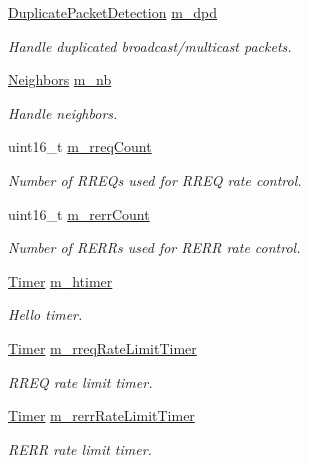 \begin{DoxyCompactItemize}
\hyperlink{classns3_1_1aodv_1_1DuplicatePacketDetection}{Duplicate\+Packet\+Detection} \hyperlink{classns3_1_1aodv_1_1RoutingProtocol_a43361f0a08b0c538415910cd904d0af9}{m\+\_\+dpd}
\begin{DoxyCompactList}\small\item\em Handle duplicated broadcast/multicast packets. \end{DoxyCompactList}\item 
\hyperlink{classns3_1_1aodv_1_1Neighbors}{Neighbors} \hyperlink{classns3_1_1aodv_1_1RoutingProtocol_ac1f61cf6b680f2fe8c82983d18bfd3cd}{m\+\_\+nb}
\begin{DoxyCompactList}\small\item\em Handle neighbors. \end{DoxyCompactList}\item 
uint16\+\_\+t \hyperlink{classns3_1_1aodv_1_1RoutingProtocol_a942f693d81f870c9ed9f155effae9577}{m\+\_\+rreq\+Count}
\begin{DoxyCompactList}\small\item\em Number of R\+R\+E\+Qs used for R\+R\+EQ rate control. \end{DoxyCompactList}\item 
uint16\+\_\+t \hyperlink{classns3_1_1aodv_1_1RoutingProtocol_a4afc71535ffd2ea1bd7dcb03e3fd4233}{m\+\_\+rerr\+Count}
\begin{DoxyCompactList}\small\item\em Number of R\+E\+R\+Rs used for R\+E\+RR rate control. \end{DoxyCompactList}\item 
\hyperlink{classns3_1_1Timer}{Timer} \hyperlink{classns3_1_1aodv_1_1RoutingProtocol_af02203aca026cce1814848e0b025d212}{m\+\_\+htimer}
\begin{DoxyCompactList}\small\item\em Hello timer. \end{DoxyCompactList}\item 
\hyperlink{classns3_1_1Timer}{Timer} \hyperlink{classns3_1_1aodv_1_1RoutingProtocol_ac8ad71cc3349d46b7740f59dd18b91b0}{m\+\_\+rreq\+Rate\+Limit\+Timer}
\begin{DoxyCompactList}\small\item\em R\+R\+EQ rate limit timer. \end{DoxyCompactList}\item 
\hyperlink{classns3_1_1Timer}{Timer} \hyperlink{classns3_1_1aodv_1_1RoutingProtocol_a0eaa679b6dea15e92c550591eabbccc1}{m\+\_\+rerr\+Rate\+Limit\+Timer}
\begin{DoxyCompactList}\small\item\em R\+E\+RR rate limit timer. \end{DoxyCompactList}\item 

\end{DoxyCompactItemize}
